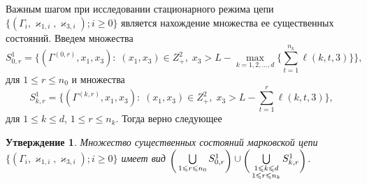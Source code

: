 \documentclass[12pt]{extarticle}
\theoremstyle{theorem}
\newtheorem{statement}{Утверждение}
\theoremstyle{remark}
\begin{document}
Важным шагом при исследовании стационарного режима цепи $\{(\Gamma_i, \varkappa_{1,i},\varkappa_{3,i}); i \geqslant 0\}$ является нахождение множества ее существенных состояний. Введем множества 
\begin{equation*}
  S^1_{0,r} = 
  \biggl\{
  (\Gamma^{(0,r)},x_1, x_3) \colon \; (x_1, x_3)\in Z^2_+,\; x_3 > L - \max\limits_{k=1, 2,
    \ldots, d}
  \biggl\{ \sum_{t=1}^{n_k} \ell({k,t,3}) \biggl\}\biggl\}, 
\end{equation*}
для $1 \leqslant r \leqslant n_0$ и множества
\begin{equation*}
  S^1_{k,r} =
  \biggl\{
  (\Gamma^{(k,r)},x_1, x_3) \colon \; (x_1, x_3)\in Z^2_+,\; x_3 > L - \sum_{t=1}^{r} \ell({k,t,3})
  \biggr\},
\end{equation*}
для $1 \leqslant k \leqslant d$,  $1 \leqslant r \leqslant n_k$.
Тогда верно следующее
\begin{statement}
Множество существенных состояний марковской цепи $\{(\Gamma_i, \varkappa_{1,i},\varkappa_{3,i}); i \geqslant 0\}$ имеет вид $\raisebox{-.5ex}{$\biggl($}\bigcup\limits_{1 \leqslant r \leqslant n_0}S^1_{0,r}\raisebox{-.5ex}{$\biggr)$}\cup \raisebox{-.5ex}{$\biggl($}\bigcup\limits_{\substack{1 \leqslant k \leqslant d\\ 1 \leqslant r \leqslant n_k}} S^1_{k,r}\raisebox{-.5ex}{$\biggr)$}$.
\end{statement}
\end{document}
